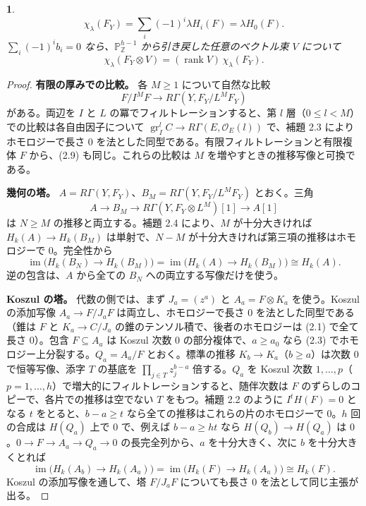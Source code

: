 \documentclass[11pt,a4paper]{ltjsarticle}
\newcommand{\stmtname}{}
\theoremstyle{plain}
\newtheorem*{stmtgen}{\stmtname}
\newenvironment{stmt}[1]{\renewcommand{\stmtname}{#1}\begin{stmtgen}}{\end{stmtgen}}
\theoremstyle{definition}
\newcommand{\rank}{\operatorname{rank}}
\newcommand{\gr}{\operatorname{gr}}
\newcommand{\im}{\operatorname{im}}
\newcommand{\Z}{\mathbb{Z}}
\newcommand{\PP}{\mathbb{P}}
\newcommand{\cO}{\mathcal{O}}
\begin{document}
\begin{stmt}{補題 2.5}
\begin{equation}\tag{2.7}
  \chi_\lambda(F_Y) = \sum_i(-1)^i\lambda H_i(F) = \lambda H_0(F).
\end{equation}
$\sum_i(-1)^ib_i = 0$ なら、$\PP^{h-1}_\Z$ から引き戻した任意のベクトル束 $V$ について
\begin{equation}\tag{2.8}
  \chi_\lambda(F_Y\otimes V) = (\rank V)\,\chi_\lambda(F_Y).
\end{equation}
\end{stmt}
\begin{proof}
\textbf{有限の厚みでの比較。} 各 $M\ge1$ について自然な比較
\begin{equation}\tag{2.9}
  F/I^MF\longrightarrow R\Gamma(Y,F_Y/L^MF_Y)
\end{equation}
がある。両辺を $I$ と $L$ の冪でフィルトレーションすると、第 $l$ 層（$0\le l<M$）での比較は各自由因子について $\gr^l_IC\to R\Gamma(E,\cO_E(l))$ で、補題 2.3 によりホモロジーで長さ $0$ を法とした同型である。有限フィルトレーションと有限複体 $F$ から、(2.9) も同じ。これらの比較は $M$ を増やすときの推移写像と可換である。

\textbf{幾何の塔。} $A = R\Gamma(Y,F_Y)$、$B_M = R\Gamma(Y,F_Y/L^MF_Y)$ とおく。三角
\begin{equation}\tag{2.10}
  A\to B_M\to R\Gamma(Y,F_Y\otimes L^M)[1]\to A[1]
\end{equation}
は $N\ge M$ の推移と両立する。補題 2.4 により、$M$ が十分大きければ $H_k(A)\to H_k(B_M)$ は単射で、$N-M$ が十分大きければ第三項の推移はホモロジーで $0$。完全性から
\begin{equation}\tag{2.11}
  \im\bigl(H_k(B_N)\to H_k(B_M)\bigr) = \im\bigl(H_k(A)\to H_k(B_M)\bigr)\cong H_k(A).
\end{equation}
逆の包含は、$A$ から全ての $B_N$ への両立する写像だけを使う。

\textbf{Koszul の塔。} 代数の側では、まず $J_a = (z^a)$ と $A_a = F\otimes K_a$ を使う。Koszul の添加写像 $A_a\to F/J_aF$ は両立し、ホモロジーで長さ $0$ を法とした同型である（錐は $F$ と $K_a\to C/J_a$ の錐のテンソル積で、後者のホモロジーは (2.1) で全て長さ $0$）。包含 $F\subseteq A_a$ は Koszul 次数 $0$ の部分複体で、$a\ge a_0$ なら (2.3) でホモロジー上分裂する。$Q_a = A_a/F$ とおく。標準の推移 $K_b\to K_a$（$b\ge a$）は次数 $0$ で恒等写像、添字 $T$ の基底を $\prod_{j\in T}z_j^{b-a}$ 倍する。$Q_a$ を Koszul 次数 $1,\dots,p$（$p = 1,\dots,h$）で増大的にフィルトレーションすると、随伴次数は $F$ のずらしのコピーで、各片での推移は空でない $T$ をもつ。補題 2.2 のように $I^tH(F) = 0$ となる $t$ をとると、$b-a\ge t$ なら全ての推移はこれらの片のホモロジーで $0$。$h$ 回の合成は $H(Q_a)$ 上で $0$ で、例えば $b-a\ge ht$ なら $H(Q_b)\to H(Q_a)$ は $0$。$0\to F\to A_a\to Q_a\to0$ の長完全列から、$a$ を十分大きく、次に $b$ を十分大きくとれば
\[
  \im\bigl(H_k(A_b)\to H_k(A_a)\bigr) = \im\bigl(H_k(F)\to H_k(A_a)\bigr)\cong H_k(F).
\]
Koszul の添加写像を通して、塔 $F/J_aF$ についても長さ $0$ を法として同じ主張が出る。


\end{proof}
\end{document}

